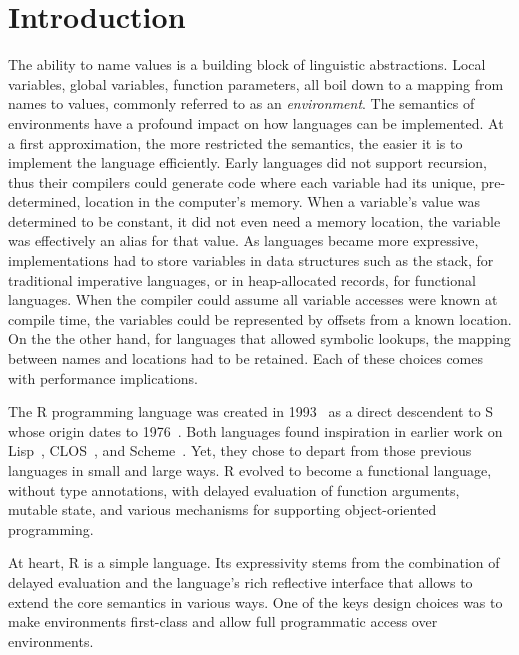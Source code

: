 \documentclass[10pt,sigplan,authorversion=true]{acmart}
\begin{document}
\maketitle
\section{Introduction}

The ability to name values is a building block of linguistic abstractions. Local
variables, global variables, function parameters, all boil down to a mapping
from names to values, commonly referred to as an \emph{environment}. The
semantics of environments have a profound impact on how languages can be
implemented. At a first approximation, the more restricted the semantics, the
easier it is to implement the language efficiently. Early languages did not
support recursion, thus their compilers could generate code where each variable
had its unique, pre-determined, location in the computer's memory. When a
variable's value was determined to be constant, it did not even need a memory
location, the variable was effectively an alias for that value. As languages
became more expressive, implementations had to store variables in data
structures such as the stack, for traditional imperative languages, or in
heap-allocated records, for functional languages. When the compiler could assume
all variable accesses were known at compile time, the variables could be
represented by offsets from a known location. On the the other hand, for
languages that allowed symbolic lookups, the mapping between names and locations
had to be retained. Each of these choices comes with performance implications.

The R programming language was created in 1993~\cite{r96} as a direct descendent
to S whose origin dates to 1976~\cite{s88}. Both languages found inspiration in
earlier work on Lisp~\cite{Lisp}, CLOS~\cite{CLOS}, and
Scheme~\cite{SchemeR5RS}. Yet, they chose to depart from those previous
languages in small and large ways. R evolved to become a functional language,
without type annotations, with delayed evaluation of function arguments, mutable
state, and various mechanisms for supporting object-oriented programming.

At heart, R is a simple language. Its expressivity stems from the combination of
delayed evaluation and the language's rich reflective interface that allows to
extend the core semantics in various ways. One of the keys design choices was to
make environments first-class and allow full programmatic access over
environments.
\end{document}
